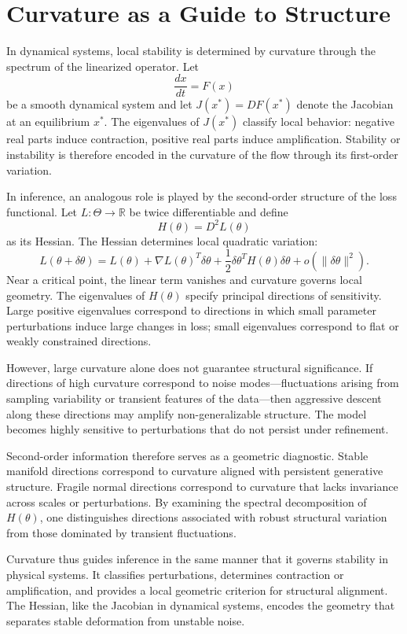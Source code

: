\documentclass[12pt]{book}
\begin{document}
\section{Curvature as a Guide to Structure}

In dynamical systems, local stability is determined by curvature through the spectrum of the linearized operator. Let
\[
\frac{dx}{dt} = F(x)
\]
be a smooth dynamical system and let $J(x^*) = DF(x^*)$ denote the Jacobian at an equilibrium $x^*$. The eigenvalues of $J(x^*)$ classify local behavior: negative real parts induce contraction, positive real parts induce amplification. Stability or instability is therefore encoded in the curvature of the flow through its first-order variation.

In inference, an analogous role is played by the second-order structure of the loss functional. Let $L : \Theta \to \mathbb{R}$ be twice differentiable and define
\[
H(\theta) = D^2 L(\theta)
\]
as its Hessian. The Hessian determines local quadratic variation:
\[
L(\theta + \delta \theta)
=
L(\theta)
+
\nabla L(\theta)^T \delta \theta
+
\frac{1}{2}
\delta \theta^T H(\theta) \delta \theta
+
o(\|\delta \theta\|^2).
\]
Near a critical point, the linear term vanishes and curvature governs local geometry. The eigenvalues of $H(\theta)$ specify principal directions of sensitivity. Large positive eigenvalues correspond to directions in which small parameter perturbations induce large changes in loss; small eigenvalues correspond to flat or weakly constrained directions.

However, large curvature alone does not guarantee structural significance. If directions of high curvature correspond to noise modes---fluctuations arising from sampling variability or transient features of the data---then aggressive descent along these directions may amplify non-generalizable structure. The model becomes highly sensitive to perturbations that do not persist under refinement.

Second-order information therefore serves as a geometric diagnostic. Stable manifold directions correspond to curvature aligned with persistent generative structure. Fragile normal directions correspond to curvature that lacks invariance across scales or perturbations. By examining the spectral decomposition of $H(\theta)$, one distinguishes directions associated with robust structural variation from those dominated by transient fluctuations.

Curvature thus guides inference in the same manner that it governs stability in physical systems. It classifies perturbations, determines contraction or amplification, and provides a local geometric criterion for structural alignment. The Hessian, like the Jacobian in dynamical systems, encodes the geometry that separates stable deformation from unstable noise.
\end{document}
